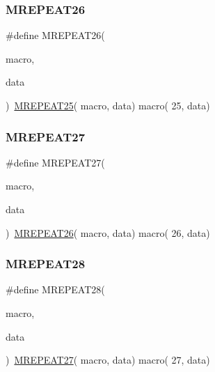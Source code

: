\mbox{\label{group__group__sam0__utils__mrepeat_ga83d8975851482186f25f70bd64384a12}} 
\subsubsection{\texorpdfstring{MREPEAT26}{MREPEAT26}}
{\footnotesize\ttfamily \#define M\+R\+E\+P\+E\+A\+T26(\begin{DoxyParamCaption}\item[{}]{macro,  }\item[{}]{data }\end{DoxyParamCaption})~\mbox{\hyperlink{group__group__sam0__utils__mrepeat_ga10a7a74d8723d1fd28cdc2b0509854d2}{M\+R\+E\+P\+E\+A\+T25}}( macro, data)   macro( 25, data)}

\mbox{\label{group__group__sam0__utils__mrepeat_gad5d25e8243cfb609c41b148d18af27ac}} 
\subsubsection{\texorpdfstring{MREPEAT27}{MREPEAT27}}
{\footnotesize\ttfamily \#define M\+R\+E\+P\+E\+A\+T27(\begin{DoxyParamCaption}\item[{}]{macro,  }\item[{}]{data }\end{DoxyParamCaption})~\mbox{\hyperlink{group__group__sam0__utils__mrepeat_ga83d8975851482186f25f70bd64384a12}{M\+R\+E\+P\+E\+A\+T26}}( macro, data)   macro( 26, data)}

\mbox{\label{group__group__sam0__utils__mrepeat_gab45193969a834715c8a19fc7c2d4a173}} 
\subsubsection{\texorpdfstring{MREPEAT28}{MREPEAT28}}
{\footnotesize\ttfamily \#define M\+R\+E\+P\+E\+A\+T28(\begin{DoxyParamCaption}\item[{}]{macro,  }\item[{}]{data }\end{DoxyParamCaption})~\mbox{\hyperlink{group__group__sam0__utils__mrepeat_gad5d25e8243cfb609c41b148d18af27ac}{M\+R\+E\+P\+E\+A\+T27}}( macro, data)   macro( 27, data)}

